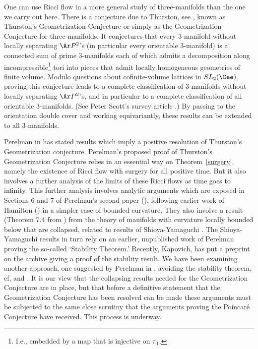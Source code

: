 One can use Ricci flow in a more general study of three-manifolds
than the one we carry out here. There is a conjecture due to
Thurston, see \cite{Thurstongeom},  known as Thurston's
Geometrization Conjecture or simply as the Geometrization Conjecture for
three-manifolds. It conjectures that every $3$-manifold without
locally separating $\Ar P^2$'s (in particular every orientable
$3$-manifold) is a connected sum of prime $3$-manifolds each of
which admits a decomposition along incompressible\footnote{I.e.,
embedded by a map that is injective on $\pi_1$.} tori into pieces
that admit locally homogeneous geometries of finite volume.  Modulo
questions about cofinite-volume lattices in $SL_2(\Cee)$, proving
this conjecture leads to a complete classification
 of  $3$-manifolds without locally separating $\Ar P^2$'s,
and in particular to a complete classification of all orientable
$3$-manifolds. (See Peter Scott's survey article \cite{Scott}.) By
passing to the orientation double cover and working equivariantly,
these results can be extended to all $3$-manifolds.


 Perelman in
\cite{Perelman2} has stated results which imply a positive
resolution of Thurston's Geometrization conjecture. Perelman's
proposed proof of Thurston's Geometrization Conjecture relies in an
essential way on Theorem~\ref{surgery}, namely the existence of
Ricci flow with surgery for all positive time. But it also involves
a further analysis of the limits of these Ricci flows as time goes
to infinity. This further analysis involves analytic arguments which
are exposed in Sections 6 and 7 of Perelman's second paper
(\cite{Perelman2}), following earlier work of Hamilton
(\cite{HamiltonNSRF3M}) in a simpler case of bounded curvature. They
also involve a result (Theorem 7.4 from \cite{Perelman2}) from the
theory of manifolds with curvature locally bounded below that are
collapsed, related to results of Shioya-Yamaguchi \cite{SY}. The
Shioya-Yamaguchi results in turn rely on an earlier, unpublished
work of Perelman proving the so-called `Stability Theorem.'
Recently, Kapovich, \cite{Kap} has put a preprint on the archive
giving a proof of the stability result. We have been examining
another approach, one suggested by Perelman in \cite{Perelman2},
avoiding the stability theorem, cf, \cite{KleinerLott2} and
\cite{MorganTian2}. It is our view that the collapsing results
needed for the Geometrization Conjecture are in place, but that
before a definitive statement that the Geometrization Conjecture has
been resolved can be made these arguments must be subjected to the
same close scrutiny that the arguments proving the Poincar\'e
Conjecture have received. This process is underway.

